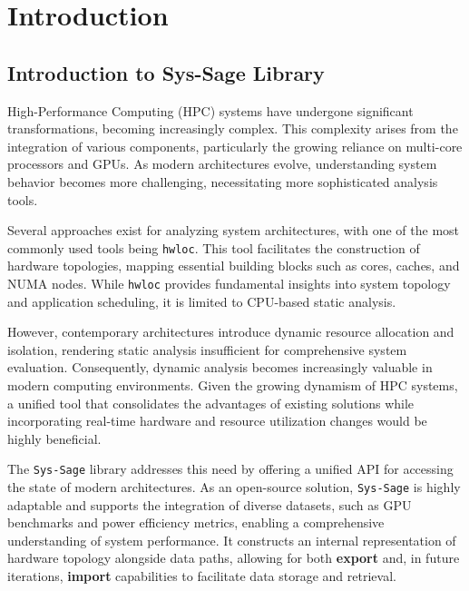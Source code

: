 
\chapter{Introduction}\label{chapter:introduction}
\section{Introduction to Sys-Sage Library}

High-Performance Computing (HPC) systems have undergone significant transformations, becoming increasingly complex. This complexity arises from the integration of various components, particularly the growing reliance on multi-core processors and \ac{GPU}s. As modern architectures evolve, understanding system behavior becomes more challenging, necessitating more sophisticated analysis tools.

Several approaches exist for analyzing system architectures, with one of the most commonly used tools being \texttt{hwloc}. This tool facilitates the construction of hardware topologies, mapping essential building blocks such as cores, caches, and \ac{NUMA} nodes. While \texttt{hwloc} provides fundamental insights into system topology and application scheduling, it is limited to \ac{CPU}-based static analysis.

However, contemporary architectures introduce dynamic resource allocation and isolation, rendering static analysis insufficient for comprehensive system evaluation. Consequently, dynamic analysis becomes increasingly valuable in modern computing environments. Given the growing dynamism of \ac{HPC} systems, a unified tool that consolidates the advantages of existing solutions while incorporating real-time hardware and resource utilization changes would be highly beneficial.

The \texttt{Sys-Sage} library addresses this need by offering a unified \ac{API} for accessing the state of modern architectures. As an \ac{open-source} solution, \texttt{Sys-Sage} is highly adaptable and supports the integration of diverse datasets, such as \ac{GPU} benchmarks and power efficiency metrics, enabling a comprehensive understanding of system performance. It constructs an internal representation of hardware topology alongside data paths, allowing for both \textbf{export} and, in future iterations, \textbf{import} capabilities to facilitate data storage and retrieval.

